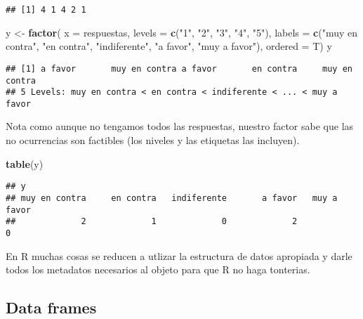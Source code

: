 \documentclass[]{article}
\newenvironment{Shaded}{\begin{snugshade}}{\end{snugshade}}
\newcommand{\KeywordTok}[1]{\textcolor[rgb]{0.13,0.29,0.53}{\textbf{{#1}}}}
\newcommand{\DataTypeTok}[1]{\textcolor[rgb]{0.13,0.29,0.53}{{#1}}}
\newcommand{\StringTok}[1]{\textcolor[rgb]{0.31,0.60,0.02}{{#1}}}
\newcommand{\NormalTok}[1]{{#1}}
\begin{document}
\begin{verbatim}
## [1] 4 1 4 2 1
\end{verbatim}

\begin{Shaded}
\begin{Highlighting}[]
\NormalTok{y <-}\StringTok{ }\KeywordTok{factor}\NormalTok{(}
  \DataTypeTok{x =} \NormalTok{respuestas,}
  \DataTypeTok{levels =} \KeywordTok{c}\NormalTok{(}\StringTok{"1"}\NormalTok{, }\StringTok{"2"}\NormalTok{, }\StringTok{"3"}\NormalTok{, }\StringTok{"4"}\NormalTok{, }\StringTok{"5"}\NormalTok{),}
  \DataTypeTok{labels =} \KeywordTok{c}\NormalTok{(}\StringTok{"muy en contra"}\NormalTok{, }\StringTok{"en contra"}\NormalTok{, }\StringTok{"indiferente"}\NormalTok{, }\StringTok{"a favor"}\NormalTok{, }\StringTok{"muy a favor"}\NormalTok{),}
  \DataTypeTok{ordered =} \NormalTok{T)}
\NormalTok{y}
\end{Highlighting}
\end{Shaded}

\begin{verbatim}
## [1] a favor       muy en contra a favor       en contra     muy en contra
## 5 Levels: muy en contra < en contra < indiferente < ... < muy a favor
\end{verbatim}

Nota como aunque no tengamos todos las respuestas, nuestro factor sabe
que las no ocurrencias son factibles (los niveles y las etiquetas las
incluyen).

\begin{Shaded}
\begin{Highlighting}[]
\KeywordTok{table}\NormalTok{(y)}
\end{Highlighting}
\end{Shaded}

\begin{verbatim}
## y
## muy en contra     en contra   indiferente       a favor   muy a favor 
##             2             1             0             2             0
\end{verbatim}

\begin{nota}[Nota]
En R muchas cosas se reducen a utlizar la estructura de datos apropiada y darle
todos los metadatos necesarios al objeto para que R no haga tonterias.
\end{nota}

\subsection{Data frames}\label{data-frames}
\end{document}
